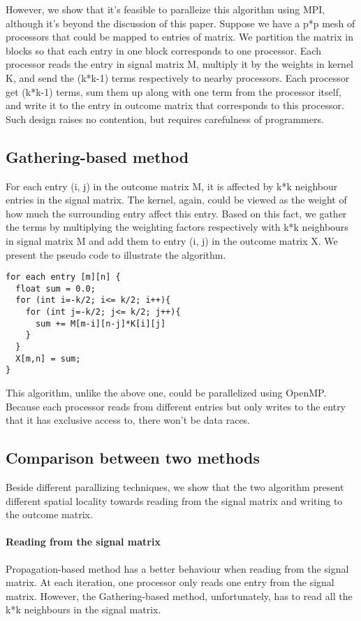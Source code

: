 \documentclass[letterpaper, 10 pt, conference]{ieeeconf}  %
\begin{document}
However, we show that it's feasible to paralleize this algorithm using MPI, although it's beyond the discussion of this paper. Suppose we have a p*p mesh of processors that could be mapped to entries of matrix. We partition the matrix in blocks so that each entry in one block corresponds to one processor. Each processor reads the entry in signal matrix M, multiply it by the weights in kernel K, and send the (k*k-1) terms respectively to nearby processors. Each processor get (k*k-1) terms, sum them up along with one term from the processor itself, and write it to the entry in outcome matrix that corresponds to this processor. Such design raises no contention, but requires carefulness of programmers. 

\subsection{Gathering-based method}
For each entry (i, j) in the outcome matrix M, it is affected by k*k neighbour entries in the signal matrix. The kernel, again, could be viewed as the weight of how much the surrounding entry affect this entry. Based on this fact, we gather the terms by multiplying the weighting factors respectively with k*k neighbours in signal matrix M and add them to entry (i, j) in the outcome matrix X.
We present the pseudo code to illustrate the algorithm.

\begin{lstlisting}
for each entry [m][n] {
  float sum = 0.0;
  for (int i=-k/2; i<= k/2; i++){
    for (int j=-k/2; j<= k/2; j++){
      sum += M[m-i][n-j]*K[i][j]
    }
  }
  X[m,n] = sum;
}
\end{lstlisting}


This algorithm, unlike the above one, could be parallelized using OpenMP. Because each processor reads from different entries but only writes to the entry that it has exclusive access to, there won't be data races.

\subsection{Comparison between two methods}

Beside different parallizing techniques, we show that the two algorithm present different spatial locality towards reading from the signal matrix and writing to the outcome matrix.

\paragraph{Reading from the signal matrix}
Propagation-based method has a better behaviour when reading from the signal matrix. At each iteration, one processor only reads one entry from the signal matrix. However, the Gathering-based method, unfortunately, has to read all the k*k neighbours in the signal matrix. 
\end{document}
